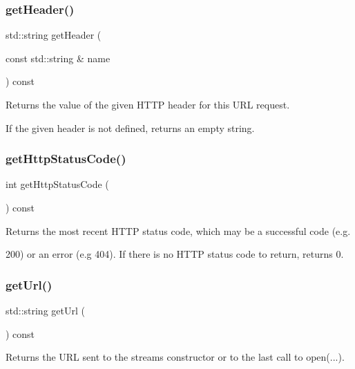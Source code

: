 \subsubsection{\texorpdfstring{get\+Header()}{getHeader()}}
{\footnotesize\ttfamily std\+::string get\+Header (\begin{DoxyParamCaption}\item[{const std\+::string \&}]{name }\end{DoxyParamCaption}) const}



Returns the value of the given H\+T\+TP header for this U\+RL request. 

If the given header is not defined, returns an empty string. \mbox{\label{classiurlstream_ab6c069ef77f1319830dcfd90eed6a2ce}} 
\subsubsection{\texorpdfstring{get\+Http\+Status\+Code()}{getHttpStatusCode()}}
{\footnotesize\ttfamily int get\+Http\+Status\+Code (\begin{DoxyParamCaption}{ }\end{DoxyParamCaption}) const}



Returns the most recent H\+T\+TP status code, which may be a successful code (e.\+g. 

200) or an error (e.\+g 404). If there is no H\+T\+TP status code to return, returns 0. \mbox{\label{classiurlstream_a0cbda75589e2fb500bbe875b72f66682}} 
\subsubsection{\texorpdfstring{get\+Url()}{getUrl()}}
{\footnotesize\ttfamily std\+::string get\+Url (\begin{DoxyParamCaption}{ }\end{DoxyParamCaption}) const}



Returns the U\+RL sent to the stream\textquotesingle{}s constructor or to the last call to open(...). 

